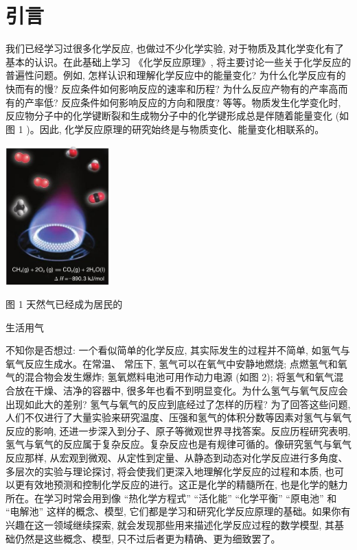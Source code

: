 \documentclass[10pt]{article}
\begin{document}
\section*{引言}

我们已经学习过很多化学反应, 也做过不少化学实验, 对于物质及其化学变化有了基本的认识。在此基础上学习 《化学反应原理》, 将主要讨论一些关于化学反应的普遍性问题。例如, 怎样认识和理解化学反应中的能量变化? 为什么化学反应有的快而有的慢? 反应条件如何影响反应的速率和历程? 为什么反应产物有的产率高而有的产率低? 反应条件如何影响反应的方向和限度? 等等。物质发生化学变化时, 反应物分子中的化学键断裂和生成物分子中的化学键形成总是伴随着能量变化 (如图 1 )。因此, 化学反应原理的研究始终是与物质变化、能量变化相联系的。

\begin{center}
\includegraphics[max width=0.3\textwidth]{images/0190da9d-8bfd-732f-bc2c-0b21d0f13b91_6_816745.jpg}
\end{center}

图 1 天然气已经成为居民的

生活用气

不知你是否想过: 一个看似简单的化学反应, 其实际发生的过程并不简单, 如氢气与氧气反应生成水。在常温、 常压下, 氢气可以在氧气中安静地燃烧; 点燃氢气和氧气的混合物会发生爆炸; 氢氧燃料电池可用作动力电源 (如图 2); 将氢气和氧气混合放在干燥、洁净的容器中, 很多年也看不到明显变化。为什么氢气与氧气反应会出现如此大的差别? 氢气与氧气的反应到底经过了怎样的历程? 为了回答这些问题, 人们不仅进行了大量实验来研究温度、压强和氢气的体积分数等因素对氢气与氧气反应的影响, 还进一步深入到分子、原子等微观世界寻找答案。反应历程研究表明, 氢气与氧气的反应属于复杂反应。复杂反应也是有规律可循的。像研究氢气与氧气反应那样, 从宏观到微观、从定性到定量、从静态到动态对化学反应进行多角度、多层次的实验与理论探讨, 将会使我们更深入地理解化学反应的过程和本质, 也可以更有效地预测和控制化学反应的进行。这正是化学的精髓所在, 也是化学的魅力所在。在学习时常会用到像 “热化学方程式” “活化能” “化学平衡” “原电池” 和 “电解池” 这样的概念、模型, 它们都是学习和研究化学反应原理的基础。如果你有兴趣在这一领域继续探索, 就会发现那些用来描述化学反应过程的数学模型, 其基础仍然是这些概念、模型, 只不过后者更为精确、更为细致罢了。
\end{document}
